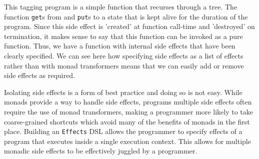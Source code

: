 This tagging program is a simple function that recurses through a tree. The
function \texttt{get}s from and \texttt{put}s to a state that is kept alive for
the duration of the program. Since this side effect is 'created' at function
call-time and 'destroyed' on termination, it makes sense to say that this
function can be invoked as a pure function. Thus, we have a function with
internal side effects that have been clearly specified. We can see here how
specifying side effects as a list of effects rather than with monad transformers
means that we can easily add or remove side effects as required. 

Isolating side effects is a form of best practice and doing so is not easy.
While monads provide a way to handle side effects, programs multiple side
effects often require the use of monad transformers, making a programmer more
likely to take coarse-grained shortcuts which avoid many of the benefits of
monads in the first place. Building an \texttt{Effects} DSL allows the
programmer to specify effects of a program that executes inside a single
execution context. This allows for multiple monadic side effects to be
effectively juggled by a programmer. 